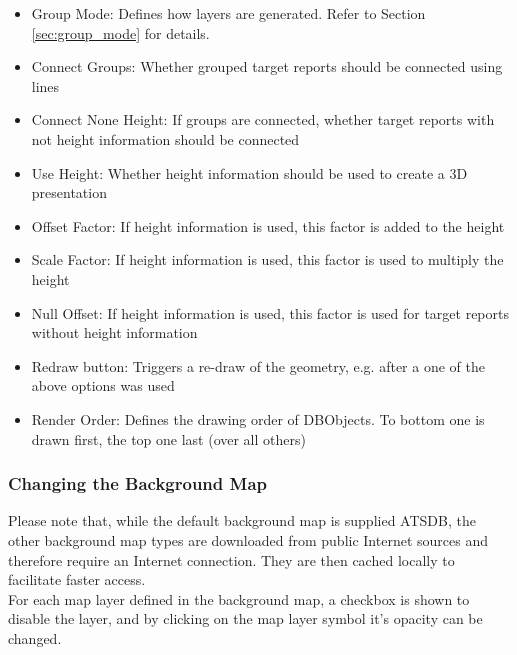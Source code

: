 \begin{itemize}
 \item Group Mode: Defines how layers are generated. Refer to Section \ref{sec:group_mode} for details.
 \item Connect Groups: Whether grouped target reports should be connected using lines
 \item Connect None Height: If groups are connected, whether target reports with not height information should be connected
 \item Use Height: Whether height information should be used to create a 3D presentation
 \item Offset Factor: If height information is used, this factor is added to the height
 \item Scale Factor: If height information is used, this factor is used to multiply the height
 \item Null Offset: If height information is used, this factor is used for target reports without height information
 \item Redraw button: Triggers a re-draw of the geometry, e.g. after a one of the above options was used
 \item Render Order: Defines the drawing order of DBObjects. To bottom one is drawn first, the top one last (over all others)
\end{itemize}

\subsubsection{Changing the Background Map}

Please note that, while the default background map is supplied ATSDB, the other background map types are downloaded from public Internet sources and therefore require an Internet connection. They are then cached locally to facilitate faster access. \\

For each map layer defined in the background map, a checkbox is shown to disable the layer, and by clicking on the map layer symbol it's opacity can be changed.

